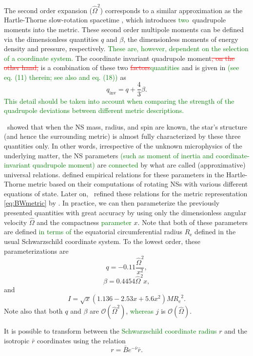 \documentclass{aa}
\newcommand{\be}{\begin{equation}}
\newcommand{\ee}{\end{equation}}
\newcommand{\refe}[1]{\textcolor{green}{{#1}}}
\newcommand{\refedel}[1]{\textcolor{red}{\sout{#1}}}
\newcommand{\Req}{\ensuremath{R_{\mathrm{e}}}}
\newcommand{\sch}{Schwarzschild }
\newcommand{\rb}{\ensuremath{\bar{r}}}
\newcommand{\Ob}{\ensuremath{\hat{\Omega}}}
\newcommand{\nub}{\ensuremath{\bar{\nu}}}
\newcommand{\Bb}{\ensuremath{\bar{B}}}
\newcommand{\qinv}{\ensuremath{q_{\mathrm{inv}}}}
\begin{document}
The second order expansion ($\Ob^2$) corresponds to a similar approximation as the Hartle-Thorne slow-rotation spacetime \citep{HT68}, which introduces \refe{two} quadrupole moments into the metric.  
These second order multipole moments can be defined via the dimensionless quantities $q$ and $\beta$, the dimensionless moments of energy density and pressure, respectively.
\refe{These are, however, dependent on the selection of a coordinate system.}
The coordinate invariant quadrupole moment\refedel{, on the other hand,} is a combination of these two \refedel{factors}\refe{quantities} and is given in \citet{PA12} \refe{(see eq. (11) therein; see also \citealt{aGM14} and eq. (18))} as
\be
\qinv =  q + \frac{4}{3} \beta.
\ee
\refe{This detail should be taken into account when comparing the strength of the quadrupole deviations between different metric descriptions.}


\citet{YY13} showed that when the NS mass, radius, and spin are known, the star's structure (and hence the surrounding metric) is almost fully characterized by these three quantities only. %
In other words, irrespective of the unknown microphysics of the underlying matter, the NS parameters \refe{(such as moment of inertia and coordinate-invariant quadrupole moment)} are \refe{connected} by what are called (approximative) universal relations.
\citet{BBP13} defined empirical relations for these parameters in the Hartle-Thorne metric based on their computations of rotating NSs with various different equations of state.
Later on, \citet{aGM14} refined these relations for the metric representation \eqref{eq:BWmetric} by \citet{BI76}.
In practice, we can then parameterize the previously presented quantities with great accuracy by using only the dimensionless angular velocity $\Ob$ and the compactness \refe{parameter} $x$.
Note that both of these parameters are defined \refe{in terms of} the equatorial circumferential radius $\Req$ defined in the usual \sch coordinate system.
To the lowest order, these parameterizations are \citep{aGM14}
\be\label{eq:quad}
q = -0.11 \frac{\Ob^2}{x^2},
\ee
\be\label{eq:beta}
\beta = 0.4454 \Ob^2 x,
\ee
and
\be\label{eq:I}
I = \sqrt{x} (1.136 - 2.53 x + 5.6 x^2) M \Req^2.
\ee
Note also that both $q$ and $\beta$ are $\mathcal{O}(\Ob^2)$, \refe{whereas} $j$ is $\mathcal{O}(\Ob)$.
    
It is possible to transform between the \refe{\sch coordinate radius} $r$ and the isotropic $\rb$ coordinates using the relation \citep{FIP86}
\be\label{eq:rb2r}
r = \Bb e^{-\nub} \rb.
\ee
\end{document}
